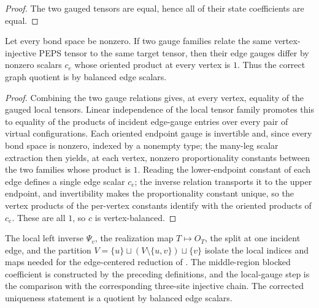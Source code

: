 \begin{proof}\leanok
    The two gauged tensors are equal, hence all of their state coefficients are
    equal.
\end{proof}

\begin{theorem}%
    \label{thm:gauge_unique_mod_edge_scalars}
    \leanok
    Let every bond space be nonzero. If two gauge families relate the same
    vertex-injective PEPS tensor to the same target tensor, then their edge
    gauges differ by nonzero scalars $c_e$ whose oriented product at every
    vertex is $1$. Thus the correct graph quotient is by balanced edge scalars.
\end{theorem}

\begin{proof}\leanok
    Combining the two gauge relations gives, at every vertex, equality of the
    gauged local tensors. Linear independence of the local tensor family
    promotes this to equality of the products of incident edge-gauge entries
    over every pair of virtual configurations. Each oriented endpoint gauge is
    invertible and, since every bond space is nonzero, indexed by a nonempty
    type; the many-leg scalar extraction then yields, at each vertex, nonzero
    proportionality constants between the two families whose product is $1$.
    Reading the lower-endpoint constant of each edge defines a single edge
    scalar $c_e$; the inverse relation transports it to the upper endpoint, and
    invertibility makes the proportionality constant unique, so the vertex
    products of the per-vertex constants identify with the oriented products of
    $c_e$. These are all $1$, so $c$ is vertex-balanced.
\end{proof}

\begin{remark}
    The local left inverse $\Psi_v$, the realization map $T \mapsto O_T$,
    the split at one incident edge, and the partition
    $V = \{u\} \sqcup (V \setminus \{u,v\}) \sqcup \{v\}$ isolate the local
    indices and maps needed for the edge-centered reduction of
    \cite[Section~3]{Molnar2018NormalPEPS}. The middle-region blocked coefficient is
    constructed by the preceding definitions, and the local-gauge step is the
    comparison with the corresponding three-site injective chain. The corrected
    uniqueness statement is a quotient by balanced edge scalars.
\end{remark}
